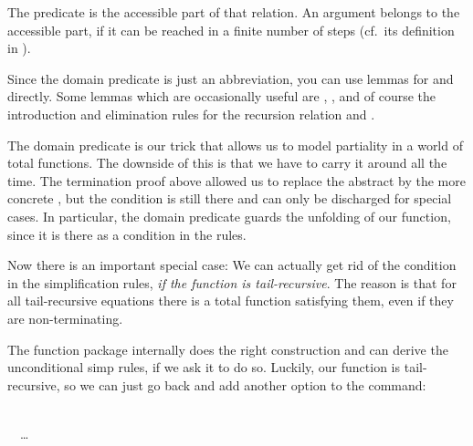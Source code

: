 \begin{isabellebody}
\begin{isamarkuptext}
  The predicate  is the accessible part of
  that relation. An argument belongs to the accessible part, if it can
  be reached in a finite number of steps (cf.~its definition in ).

  Since the domain predicate is just an abbreviation, you can use
  lemmas for  and  directly. Some
  lemmas which are occasionally useful are , , and of course the introduction and elimination rules
  for the recursion relation  and .%
\end{isamarkuptext}%
\isamarkuptrue%
%
\isamarkuptrue%
%
\begin{isamarkuptext}%
The domain predicate is our trick that allows us to model partiality
  in a world of total functions. The downside of this is that we have
  to carry it around all the time. The termination proof above allowed
  us to replace the abstract  by the more
  concrete , but the condition is still
  there and can only be discharged for special cases.
  In particular, the domain predicate guards the unfolding of our
  function, since it is there as a condition in the 
  rules. 

  Now there is an important special case: We can actually get rid
  of the condition in the simplification rules, \emph{if the function
  is tail-recursive}. The reason is that for all tail-recursive
  equations there is a total function satisfying them, even if they
  are non-terminating. 

%
%


  The function package internally does the right construction and can
  derive the unconditional simp rules, if we ask it to do so. Luckily,
  our  function is tail-recursive, so we can just go
  back and add another option to the  command:

\vspace{1ex}
\noindent{} \\%
\isanewline%
\ \ \ldots\\%


\end{isamarkuptext}
\end{isabellebody}
